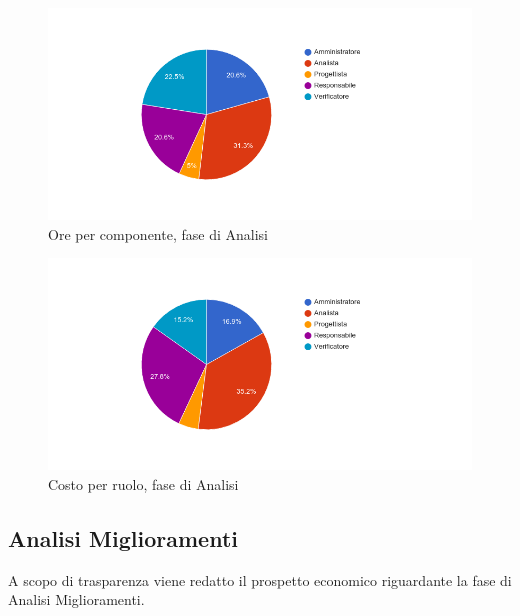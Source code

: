 \begin{figure}[H]
  \begin{center}
    \includegraphics[width=15cm]{res/img/prospettoEconomico/orePerRuoloAnalisi.png}
  \caption{Ore per componente, fase di Analisi}
  \end{center} 
\end{figure}  

\begin{figure}[H]
  \begin{center}
    \includegraphics[width=15cm]{res/img/prospettoEconomico/costoPerRuoloAnalisi.png}
  \caption{Costo per ruolo, fase di Analisi}
  \end{center} 
\end{figure}  


\subsection{Analisi Miglioramenti}
A scopo di trasparenza viene redatto il prospetto economico riguardante la fase di Analisi Miglioramenti.

